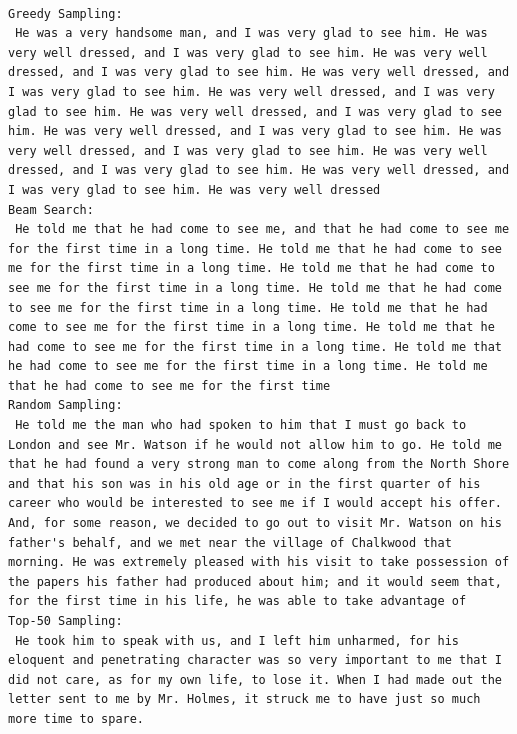 \documentclass[../labs.tex]{subfiles}
\begin{document}
\hypertarget{out:lab03-gpt2-c16}{}\label{out:lab03-gpt2-c16}

\begin{lstlisting}[style=terminalOutput,breakatwhitespace=false,columns=fullflexible]

Greedy Sampling:
 He was a very handsome man, and I was very glad to see him. He was very well dressed, and I was very glad to see him. He was very well dressed, and I was very glad to see him. He was very well dressed, and I was very glad to see him. He was very well dressed, and I was very glad to see him. He was very well dressed, and I was very glad to see him. He was very well dressed, and I was very glad to see him. He was very well dressed, and I was very glad to see him. He was very well dressed, and I was very glad to see him. He was very well dressed, and I was very glad to see him. He was very well dressed
Beam Search:
 He told me that he had come to see me, and that he had come to see me for the first time in a long time. He told me that he had come to see me for the first time in a long time. He told me that he had come to see me for the first time in a long time. He told me that he had come to see me for the first time in a long time. He told me that he had come to see me for the first time in a long time. He told me that he had come to see me for the first time in a long time. He told me that he had come to see me for the first time in a long time. He told me that he had come to see me for the first time
Random Sampling:
 He told me the man who had spoken to him that I must go back to London and see Mr. Watson if he would not allow him to go. He told me that he had found a very strong man to come along from the North Shore and that his son was in his old age or in the first quarter of his career who would be interested to see me if I would accept his offer. And, for some reason, we decided to go out to visit Mr. Watson on his father's behalf, and we met near the village of Chalkwood that morning. He was extremely pleased with his visit to take possession of the papers his father had produced about him; and it would seem that, for the first time in his life, he was able to take advantage of
Top-50 Sampling:
 He took him to speak with us, and I left him unharmed, for his eloquent and penetrating character was so very important to me that I did not care, as for my own life, to lose it. When I had made out the letter sent to me by Mr. Holmes, it struck me to have just so much more time to spare.


\end{lstlisting}
\end{document}
